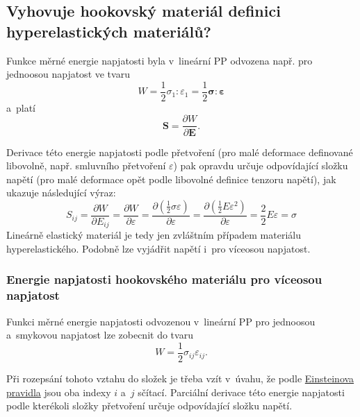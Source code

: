 
\subsection{Vyhovuje hookovský materiál definici hyperelastických materiálů?}
Funkce měrné energie napjatosti byla v~lineární PP odvozena např. pro jednoosou napjatost ve tvaru
\begin{equation}
	W = \frac{1}{2} \sigma_1:\varepsilon_1 = \frac{1}{2} \bm{\sigma}:\bm{\varepsilon}
\end{equation}
a~platí
\begin{equation}
	\bm{S} = \frac{\partial W}{\partial \bm{E}}.
\end{equation}

Derivace této energie napjatosti podle přetvoření (pro malé deformace definované libovolně, např. smluvního přetvoření $\varepsilon$) pak opravdu určuje odpovídající složku napětí (pro malé deformace opět podle libovolné definice tenzoru napětí), jak ukazuje následující výraz:
\begin{equation}
	S_{ij} = \frac{\partial W}{\partial E_{ij}}
	= \frac{\partial W}{\partial \varepsilon}
	= \frac{\partial \left(\frac{1}{2} \sigma \varepsilon\right)}{\partial \varepsilon}
	= \frac{\partial \left(\frac{1}{2} E \varepsilon^2\right)}{\partial \varepsilon}
	= \frac{2}{2} E \varepsilon = \sigma
\end{equation}
Lineárně elastický materiál je tedy jen zvláštním případem materiálu hyperelastického.
Podobně lze vyjádřit napětí i~pro víceosou napjatost.

\subsubsection{Energie napjatosti hookovského materiálu pro víceosou napjatost}
Funkci měrné energie napjatosti odvozenou v~lineární PP pro jednoosou a~smykovou napjatost lze zobecnit do tvaru
\begin{equation}
	W = \frac{1}{2} \sigma_{ij} \varepsilon_{ij}.
\end{equation}

Při rozepsání tohoto vztahu do složek je třeba vzít v~úvahu, že podle \hyperref[sec:einsteinovo-scitaci-pravidlo]{Einsteinova pravidla} jsou oba indexy $i$ a~$j$ sčítací.
Parciální derivace této energie napjatosti podle kterékoli složky přetvoření určuje odpovídající složku napětí.

